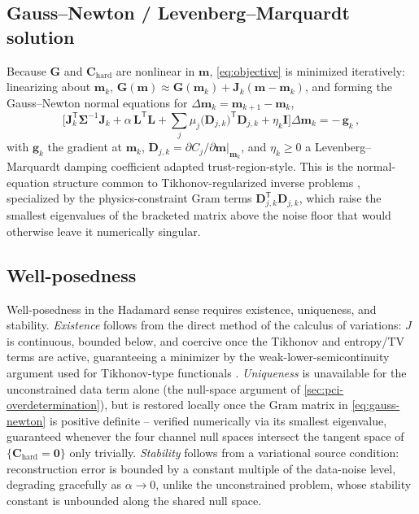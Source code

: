 \subsection{Gauss--Newton / Levenberg--Marquardt solution}

Because $\mathbf G$ and $\mathbf C_{\mathrm{hard}}$ are nonlinear in $\mathbf m$, \cref{eq:objective} is minimized iteratively: linearizing about $\mathbf m_{k}$, $\mathbf G(\mathbf m)\approx \mathbf G(\mathbf m_{k})+\mathbf J_{k}(\mathbf m-\mathbf m_{k})$, and forming the Gauss--Newton normal equations for $\Delta\mathbf m_{k}=\mathbf m_{k+1}-\mathbf m_{k}$,
\begin{equation}
\Big[\mathbf J_{k}^{\mathsf T}\boldsymbol\Sigma^{-1}\mathbf J_{k} + \alpha\,\mathbf L^{\mathsf T}\mathbf L + \sum_{j}\mu_{j}\big(\mathbf D_{j,k}\big)^{\mathsf T}\mathbf D_{j,k} + \eta_{k}\mathbf I\Big]\Delta\mathbf m_{k} = -\,\mathbf g_{k} \, , \label{eq:gauss-newton}
\end{equation}
with $\mathbf g_{k}$ the gradient at $\mathbf m_{k}$, $\mathbf D_{j,k}=\partial C_{j}/\partial\mathbf m|_{\mathbf m_{k}}$, and $\eta_{k}\ge 0$ a Levenberg--Marquardt damping coefficient adapted trust-region-style. This is the normal-equation structure common to Tikhonov-regularized inverse problems \cite{ref0695}, specialized by the physics-constraint Gram terms $\mathbf D_{j,k}^{\mathsf T}\mathbf D_{j,k}$, which raise the smallest eigenvalues of the bracketed matrix above the noise floor that would otherwise leave it numerically singular.

\subsection{Well-posedness}

Well-posedness in the Hadamard sense requires existence, uniqueness, and stability. \emph{Existence} follows from the direct method of the calculus of variations: $J$ is continuous, bounded below, and coercive once the Tikhonov and entropy/TV terms are active, guaranteeing a minimizer by the weak-lower-semicontinuity argument used for Tikhonov-type functionals \cite{ref0692}. \emph{Uniqueness} is unavailable for the unconstrained data term alone (the null-space argument of \cref{sec:pci-overdetermination}), but is restored locally once the Gram matrix in \cref{eq:gauss-newton} is positive definite -- verified numerically via its smallest eigenvalue, guaranteed whenever the four channel null spaces intersect the tangent space of $\{\mathbf C_{\mathrm{hard}}=\mathbf 0\}$ only trivially. \emph{Stability} follows from a variational source condition: reconstruction error is bounded by a constant multiple of the data-noise level, degrading gracefully as $\alpha\to 0$, unlike the unconstrained problem, whose stability constant is unbounded along the shared null space.

